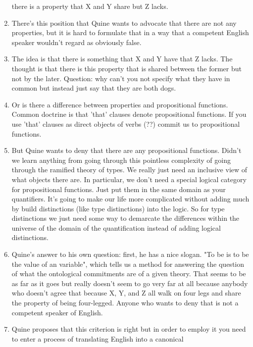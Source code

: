 \documentclass[12pt]{article}
\theoremstyle{definition}
\begin{document}
\begin{enumerate}
        there is a property that X and Y share but Z lacks.
    \item
        There's this position that Quine wants to advocate that there are not
        any properties, but it is hard to formulate that in a way that a
        competent English speaker wouldn't regard as obviously false.
    \item
        The idea is that there is something that X and Y have that Z lacks. The
        thought is that there is this property that is shared between the
        former but not by the later. Question: why can't you not specify what
        they have in common but instead just say that they are both dogs.
    \item
        Or is there a difference between properties and propositional
        functions. Common doctrine is that 'that' clauses denote propositional
        functions. If you use 'that' clauses as direct objects of verbs (??)
        commit us to propositional functions.
    \item
        But Quine wants to deny that there are any propositional functions.
        Didn't we learn anything from going through this pointless complexity
        of going through the ramified theory of types. We really just need an
        inclusive view of what objects there are. In particular, we don't need
        a special logical category for propositional functions. Just put them
        in the same domain as your quantifiers. It's going to make our life
        more complicated without adding much by build distinctions (like type
        distinctions) into the logic. So for type distinctions we just need
        some way to demarcate the differences within the universe of the domain
        of the quantification instead of adding logical distinctions. 
    \item
        Quine's answer to his own question: first, he has a nice slogan. "To be
        is to be the value of an variable", which tells us a method for
        answering the question of what the ontological commitments are of a
        given theory. That seems to be as far as it goes but really doesn't
        seem to go very far at all because anybody who doesn't agree that
        because X, Y, and Z all walk on four legs and share the property of
        being four-legged. Anyone who wants to deny that is not a competent
        speaker of English. 
    \item
        Quine proposes that this criterion is right but in order to employ it
        you need to enter a process of translating English into a canonical

\end{enumerate}
\end{document}
